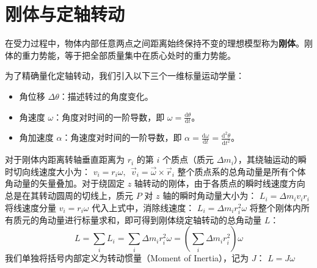 
\section{刚体与定轴转动}

\begin{definition}[刚体]\label{def:rigid-body}
在受力过程中，物体内部任意两点之间距离始终保持不变的理想模型称为\textbf{刚体}。刚体的重力势能，等于把全部质量集中在质心处时的重力势能。
\end{definition}
为了精确量化定轴转动，我们引入以下三个一维标量运动学量：
\begin{itemize}
\item 角位移 $\Delta \theta$：描述转过的角度变化。
\item 角速度 $\omega$：角度对时间的一阶导数，即 $\omega = \frac{\mathrm{d}\theta}{\mathrm{d}t}$。
\item 角加速度 $\alpha$：角速度对时间的一阶导数，即 $\alpha = \frac{\mathrm{d}\omega}{\mathrm{d}t} = \frac{\mathrm{d}^2\theta}{\mathrm{d}t^2}$。
\end{itemize}
对于刚体内距离转轴垂直距离为 $r_i$ 的第 $i$ 个质点（质元 $\Delta m_i$），其绕轴运动的瞬时切向线速度大小为：
 \(v_i = r_i \omega,~~\vec{v}_i = \vec{\omega} \times \vec{r}_i\) 
整个质点系的总角动量是所有个体角动量的矢量叠加。对于绕固定 $z$ 轴转动的刚体，由于各质点的瞬时线速度方向总是在其转动圆周的切线上，质元 $P$ 对 $z$ 轴的瞬时角动量大小为： \(L_i = \Delta m_i v_i r_i\) 将线速度分量 $v_i = r_i \omega$ 代入上式中，消除线速度： \(L_i = \Delta m_i r_i^2 \omega\) 将整个刚体内所有质元的角动量进行标量求和，即可得到刚体绕定轴转动的总角动量 $L$：$$L = \sum_i L_i = \sum_i \Delta m_i r_i^2 \omega = \left( \sum_i \Delta m_i r_i^2 \right) \omega$$
我们单独将括号内部定义为转动惯量（Moment of Inertia），记为 $J$： \(\boxed{L = J\omega}\) 
